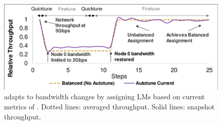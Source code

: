 


\begin{figure}
	\centering
	\includegraphics[width=.5\linewidth, trim=2 1 3 3,clip]{Figures/autotunebw.pdf}
	\caption{\autoplink adapts to bandwidth changes by assigning LMs based on current metrics of \ha. Dotted lines: averaged throughput. Solid lines: snapshot throughput.}
	\label{fig:autotunebw}
\end{figure}





